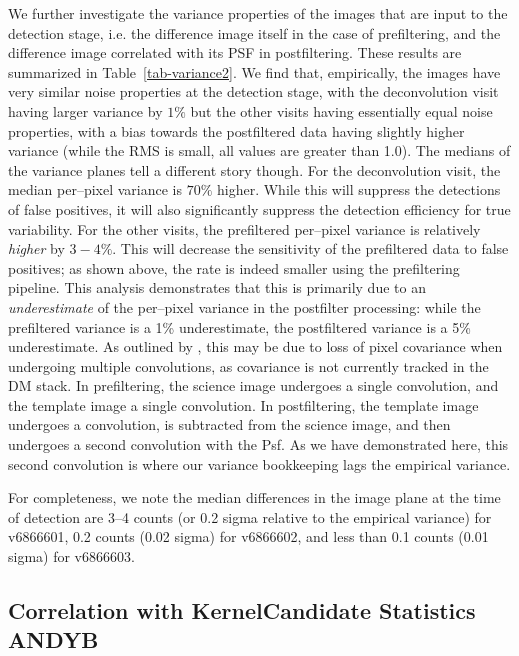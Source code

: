 \documentclass[prd, nofootinbib, floatfix, 11pt,tightenlines,times]{article}
\begin{document}
We further investigate the variance properties of the images that are
input to the detection stage, i.e. the difference image itself in the
case of prefiltering, and the difference image correlated with its PSF
in postfiltering.  These results are summarized in
Table~\ref{tab-variance2}.  We find that, empirically, the images have
very similar noise properties at the detection stage, with the
deconvolution visit having larger variance by $1\%$ but the other
visits having essentially equal noise properties, with a bias towards
the postfiltered data having slightly higher variance (while the RMS
is small, all values are greater than 1.0).  The medians of the
variance planes tell a different story though.  For the deconvolution
visit, the median per--pixel variance is $70\%$ higher.  While this
will suppress the detections of false positives, it will also
significantly suppress the detection efficiency for true variability.
For the other visits, the prefiltered per--pixel variance is
relatively {\it higher} by $3-4\%$.  This will decrease the
sensitivity of the prefiltered data to false positives; as shown
above, the rate is indeed smaller using the prefiltering pipeline.
This analysis demonstrates that this is primarily due to an {\it
  underestimate} of the per--pixel variance in the postfilter
processing: while the prefiltered variance is a 1\% underestimate, the
postfiltered variance is a 5\% underestimate.  As outlined by
\cite{Price-Stacking}, this may be due to loss of pixel covariance
when undergoing multiple convolutions, as covariance is not currently
tracked in the DM stack.  In prefiltering, the science image undergoes
a single convolution, and the template image a single convolution.  In
postfiltering, the template image undergoes a convolution, is
subtracted from the science image, and then undergoes a second
convolution with the Psf.  As we have demonstrated here, this second
convolution is where our variance bookkeeping lags the empirical
variance.

For completeness, we note the median differences in the image plane at
the time of detection are 3--4 counts (or 0.2 sigma relative to the
empirical variance) for v6866601, 0.2 counts (0.02 sigma) for
v6866602, and less than 0.1 counts (0.01 sigma) for v6866603.

\subsection{Correlation with KernelCandidate Statistics {\bf ANDYB}}
\end{document}
